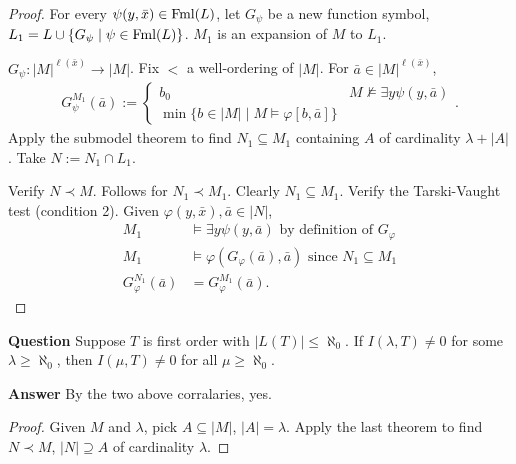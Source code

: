\documentclass{report}
\begin{document}
\begin{proof}
    For every $\psi(y, \bar x) \in \text{Fml}(L)$, let $G_\psi$ be a new function symbol, $L_1 = L \cup \{ G_\psi \mid \psi \in \text{Fml}(L)\}$. $M_1$ is an expansion of $M$ to $L_1$. 

    $G_\psi : |M|^{\ell(\bar x)} \to |M|$. Fix $<$ a well-ordering of $|M|$. For $\bar a \in |M|^{\ell(\bar x)}$, 
    \begin{align*}
        G_{\psi}^{M_1}(\bar a) := \begin{cases} 
            b_0 & M \not\models \exists y \psi(y, \bar a) \\
            \min\{ b \in |M| \mid M \models \varphi[b, \bar a]\}
        \end{cases}.
    \end{align*}
    Apply the submodel theorem to find $N_1 \subseteq M_1$ containing $A$ of cardinality $\lambda + |A|$. Take $N:= N_1 \cap L_1$. 

    Verify $N \prec M$. Follows for $N_1 \prec M_1$. Clearly $N_1 \subseteq M_1$. Verify the Tarski-Vaught test (condition 2). Given $\varphi(y, \bar x), \bar a\in |N|$, 
    \begin{align*}
        M_1 &\models \exists y \psi(y, \bar a) \text{ by definition of $G_\varphi$} \\
        M_1 &\models \varphi(G_{\varphi}(\bar a), \bar a) \text{ since $N_1 \subseteq M_1$} \\
        G_{\varphi}^{N_1} (\bar a) &= G_{\varphi}^{M_1}(\bar a).
    \end{align*}
\end{proof}




\noindent \textbf{Question} Suppose $T$ is first order with $|L(T)| \leq \aleph_0$. If $I(\lambda, T) \neq 0$ for some $\lambda \geq \aleph_0$, then $I(\mu, T) \neq 0$ for all $\mu \geq \aleph_0$. 

\noindent \textbf{Answer} By the two above corralaries, yes.
\begin{proof}
    Given $M$ and $\lambda$, pick $A \subseteq |M|$, $|A| = \lambda$. Apply the last theorem to find $N \prec M$, $|N| \supseteq A$ of cardinality $\lambda$.
\end{proof}
\end{document}
